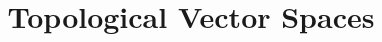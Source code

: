 



\title{Topological Vector Spaces}

\maketitle

\label{section-phantom}

\tableofcontents
\newpage





\newpage






